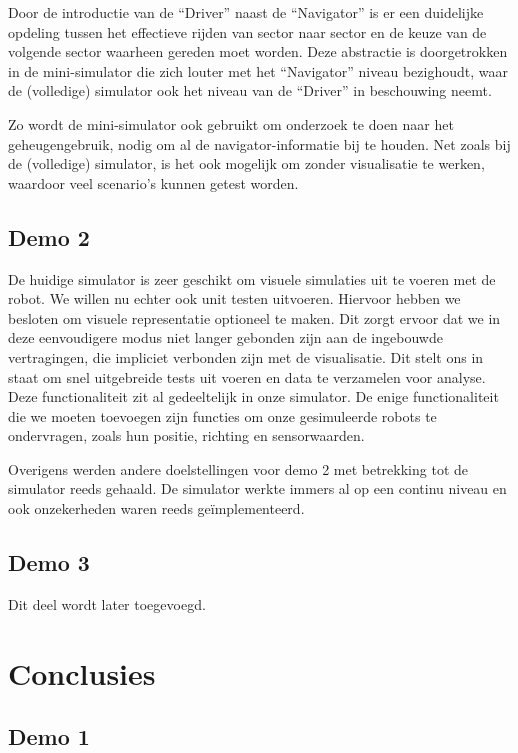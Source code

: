 \documentclass[12pt,a4paper]{report}
\begin{document}
Door de introductie van de ``Driver'' naast de ``Navigator'' is er een duidelijke opdeling tussen het effectieve rijden van sector naar sector en de keuze van de volgende sector waarheen gereden moet worden. Deze abstractie is doorgetrokken in de mini-simulator die zich louter met het ``Navigator'' niveau bezighoudt, waar de (volledige) simulator ook het niveau van de ``Driver'' in beschouwing neemt.

Zo wordt de mini-simulator ook gebruikt om onderzoek te doen naar het geheugengebruik, nodig om al de navigator-informatie bij te houden. Net zoals bij de (volledige) simulator, is het ook mogelijk om zonder visualisatie te werken, waardoor veel scenario's kunnen getest worden.

\section{Demo 2}

De huidige simulator is zeer geschikt om visuele simulaties uit te voeren met de robot. We willen nu echter ook unit testen uitvoeren. Hiervoor hebben we besloten om visuele representatie optioneel te maken. Dit zorgt ervoor dat we in deze eenvoudigere modus niet langer gebonden zijn aan de ingebouwde vertragingen, die impliciet verbonden zijn met de visualisatie.
Dit stelt ons in staat om snel uitgebreide tests uit voeren en data te verzamelen voor analyse.
Deze functionaliteit zit al gedeeltelijk in onze simulator. De enige functionaliteit die we moeten toevoegen zijn functies om onze gesimuleerde robots te ondervragen, zoals hun positie, richting en sensorwaarden.

Overigens werden andere doelstellingen voor demo 2 met betrekking tot de simulator reeds gehaald. De simulator werkte immers al op een continu niveau en ook onzekerheden waren reeds ge\"implementeerd.

\section{Demo 3}

Dit deel wordt later toegevoegd.

\chapter{Conclusies}

\section{Demo 1}
\end{document}
